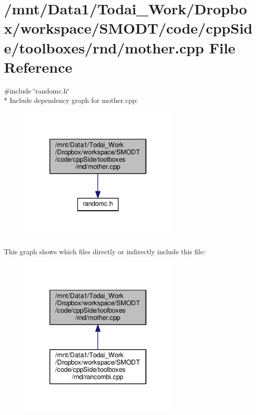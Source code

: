 \section{/mnt/\-Data1/\-Todai\-\_\-\-Work/\-Dropbox/workspace/\-S\-M\-O\-D\-T/code/cpp\-Side/toolboxes/rnd/mother.cpp File Reference}
\label{toolboxes_2rnd_2mother_8cpp}
{\ttfamily \#include \char`\"{}randomc.\-h\char`\"{}}\\*
Include dependency graph for mother.\-cpp\-:\nopagebreak
\begin{figure}[H]
\begin{center}
\leavevmode
\includegraphics[width=226pt]{toolboxes_2rnd_2mother_8cpp__incl}
\end{center}
\end{figure}
This graph shows which files directly or indirectly include this file\-:\nopagebreak
\begin{figure}[H]
\begin{center}
\leavevmode
\includegraphics[width=226pt]{toolboxes_2rnd_2mother_8cpp__dep__incl}
\end{center}
\end{figure}
